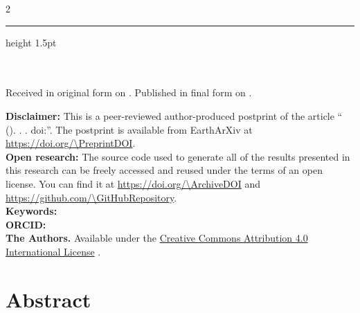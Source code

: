\documentclass[onecolumn,10pt,a4paper]{article}
\begin{document}
\thispagestyle{plain}
\begin{FlushLeft}
  \begin{spacing}{2}
    {\LARGE\bfseries \Title}
  \end{spacing}
  {\color{lightgray}\hrule height 1.5pt}
  \vspace{0.3cm}
  \Authors
  \\[0.2cm]
  {\footnotesize \Affiliations}
  \newline
  {\footnotesize \Corresponding}
  \\[0.2cm]
  {\footnotesize
    Received in original form on \SubmittedOn.
    Published in final form on \PublishedOn.
  }
\end{FlushLeft}

\begin{summarybox}
  \noindent
  \textbf{Disclaimer:}
  This is a peer-reviewed author-produced postprint of the article
  ``\AuthorShort{} (\Year). \Title. \textit{\Journal}.
  doi:\href{https://doi.org/\JournalDOI}{\JournalDOI}''.
  The postprint is available from EarthArXiv at
  \url{https://doi.org/\PreprintDOI}.
  \\[0.25cm]
  \noindent
  \textbf{Open research:}
  The source code used to generate all of the results presented in this
  research can be freely accessed and reused under the terms of an open license.
  You can find it at \url{https://doi.org/\ArchiveDOI} and
  \url{https://github.com/\GitHubRepository}.
  \\[0.2cm]
  \noindent
  \textbf{Keywords:} \Keywords{}
  \\[0.2cm]
  \noindent
  \textbf{ORCID:} \AuthorORCIDs{}
  \\[0.2cm]
  \noindent
  \textbf{\textcopyright{} \Year{} The Authors.}
  Available under the \href{https://creativecommons.org/licenses/by/4.0/}{Creative Commons Attribution 4.0 International License}
  \faCreativeCommons\faCreativeCommonsBy{}.
\end{summarybox}

\section*{\normalsize Abstract}
\begingroup
   \small  \par
\endgroup





\end{document}
